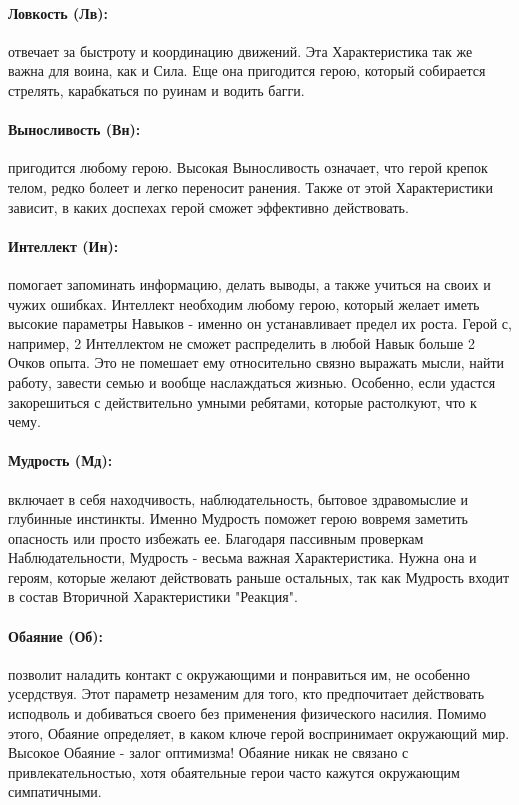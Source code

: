 \paragraph{Ловкость (Лв):} отвечает за быстроту и координацию движений. Эта Характеристика так же важна для воина, как и Сила. Еще она пригодится герою, который собирается стрелять, карабкаться по руинам и водить багги.

\paragraph{Выносливость (Вн):} пригодится любому герою. Высокая Выносливость означает, что герой крепок телом, редко болеет и легко переносит ранения. Также от этой Характеристики зависит, в каких доспехах герой сможет эффективно действовать.

\paragraph{Интеллект (Ин):} помогает запоминать информацию, делать выводы, а также учиться на своих и чужих ошибках. Интеллект необходим любому герою, который желает иметь высокие параметры Навыков - именно он устанавливает предел их роста.
\newline Герой с, например, 2 Интеллектом не сможет распределить в любой Навык больше 2 Очков опыта. Это не помешает ему относительно связно выражать мысли, найти работу, завести семью и вообще наслаждаться жизнью. Особенно, если удастся закорешиться с действительно умными ребятами, которые растолкуют, что к чему. 

\paragraph{Мудрость (Мд):} включает в себя находчивость, наблюдательность, бытовое здравомыслие и глубинные инстинкты. Именно Мудрость поможет герою вовремя заметить опасность или просто избежать ее.
\newline Благодаря пассивным проверкам Наблюдательности, Мудрость - весьма важная Характеристика. Нужна она и героям, которые желают действовать раньше остальных, так как Мудрость входит в состав Вторичной Характеристики "Реакция".

\paragraph{Обаяние (Об):} позволит наладить контакт с окружающими и понравиться им, не особенно усердствуя. Этот параметр незаменим для того, кто предпочитает действовать исподволь и добиваться своего без применения физического насилия. Помимо этого, Обаяние определяет, в каком ключе герой воспринимает окружающий мир. Высокое Обаяние - залог оптимизма!
\newline Обаяние никак не связано с привлекательностью, хотя обаятельные герои часто кажутся окружающим симпатичными. 

